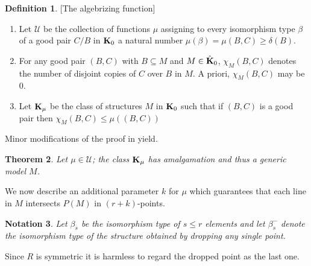 \documentclass[11pt]{amsart}
\def\bK{{\bf K}}
\def\Uscr{\mathcal U}
\def\abar{{\bf a}}
\newtheorem{theorem}{Theorem}[section]
\newtheorem{lemma}[theorem]{Lemma}
\newtheorem{notation}[theorem]{Notation}
\theoremstyle{definition}
\newtheorem{definition}[theorem]{Definition}
\theoremstyle{remark}
\numberwithin{equation}{section}
\begin{document}
	\begin{definition}     \label{Kmu} [The algebrizing function]	
	\begin{enumerate}
	\item  Let $\Uscr$ be the collection of functions $\mu$
 assigning to every isomorphism type ${\beta}$ of a good pair $C/B$ in
$\bK_0$ a natural number
$\mu({\beta}) = \mu(B,C) \geq \delta(B)$. %

\item For any good pair $(B,C)$ with $B \subseteq M$ and $M \in \hat
    \bK_0$, $\chi_M(B,C)$ denotes the number of disjoint copies of $C$ over
 $B$ in $M$. A priori,  $\chi_M(B,C)$ may be $0$.




	\item\label{Kmuitem} Let $\bK_\mu$ be the class of structures $M$ in
$\bK_0$ such that  if $(B,C)$ is a good pair then $\chi_M(B,C) \leq
\mu((B,C))$


\end{enumerate}	
\end{definition}

Minor modifications of the proof in \cite{BaldwinPao} yield.
\begin{theorem} Let $\mu \in \Uscr$;
the class $\bK_{\mu}$ has amalgamation and thus a generic model $M$.
\end{theorem}


We now describe an additional parameter $k$ for $\mu$ which guarantees that
each line in $M$ intersects $P(M)$ in $(r+k)$-points.


\begin{notation} \label{notbeta} Let $\beta_s$ be the isomorphism type of $s \leq r$ elements
 and let $\beta^{-}_s$ denote the isomorphism type of the structure obtained by dropping any single point.
\end{notation}


Since $R$ is symmetric it is harmless to regard the dropped point as the last
one.
\end{document}
